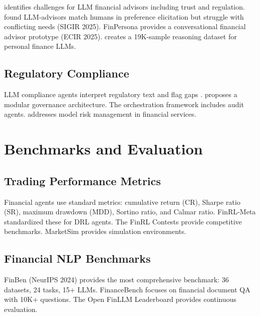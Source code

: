 \documentclass[12pt]{report}
\begin{document}
\citet{lo2024chatgptretire} identifies challenges for LLM financial advisors including trust and regulation. \citet{takayanagi2025advisor} found LLM-advisors match humans in preference elicitation but struggle with conflicting needs (SIGIR 2025). FinPersona \citep{takayanagi2025finpersona} provides a conversational financial advisor prototype (ECIR 2025). \citet{behavioral2025personalfinance} creates a 19K-sample reasoning dataset for personal finance LLMs.

\section{Regulatory Compliance}

LLM compliance agents interpret regulatory text and flag gaps \citep{arner2017fintech}. \citet{kurshan2025agenticregulator} proposes a modular governance architecture. The orchestration framework \citep{li2025orchestration} includes audit agents. \citet{okpala2025agenticfinancial} addresses model risk management in financial services.


\chapter{Benchmarks and Evaluation}

\section{Trading Performance Metrics}

Financial agents use standard metrics: cumulative return (CR), Sharpe ratio (SR), maximum drawdown (MDD), Sortino ratio, and Calmar ratio. FinRL-Meta \citep{liu2022finrlmeta} standardized these for DRL agents. The FinRL Contests \citep{wang2025finrlcontests} provide competitive benchmarks. MarketSim \citep{gu2024marketsim} provides simulation environments.

\section{Financial NLP Benchmarks}

FinBen \citep{xie2024finben} (NeurIPS 2024) provides the most comprehensive benchmark: 36 datasets, 24 tasks, 15+ LLMs. FinanceBench \citep{islam2023financebench} focuses on financial document QA with 10K+ questions. The Open FinLLM Leaderboard \citep{lin2025openfinllm} provides continuous evaluation.
\end{document}
